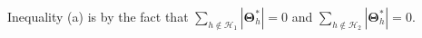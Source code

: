 \documentclass[12pt,letter]{article}\usepackage[]{graphicx}\usepackage[]{color}
\newcommand{\bTheta}{\boldsymbol{\Theta}}
\newcommand{\btheta}{\boldsymbol{\theta}}
\newcommand{\bThetastar}{\boldsymbol{\Theta}^{*}}
\newcommand{\bdelta}{\boldsymbol{\delta}}
\newcommand{\A}{\mathcal{A}}
\begin{document}

Inequality (a) is by the fact that $\sum_{h\notin\mathcal{H}_1}|\bTheta_{h}^{*}|=0$ and $\sum_{h\notin\mathcal{H}_2}|\bTheta_{h}^{*}|=0$. 
\end{document}

